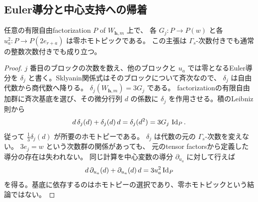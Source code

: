 \subsection{Euler導分と中心支持への帰着}

\begin{lemma}[ブロックpotentialの零ホモトピー]\label{lem:block-euler}
 任意の有限自由factorization \(P\) of \(W_{\mathbf h,m}\) 上で、
 各 \(G_j:P\to P(w)\) と各 \(u_a^2:P\to P(2e_{r+a})\) は零ホモトピックである。
 この主張は \(\Gamma_s\)-次数付きでも通常の整数次数付きでも成り立つ。
\end{lemma}
\begin{proof}
 \(j\) 番目のブロックの次数を数え、他のブロックと \(u_a\) では零となるEuler導分を
 \(\delta_j\) と書く。Sklyanin関係式はそのブロックについて斉次なので、
 \(\delta_j\) は自由代数から商代数へ降りる。
 \(\delta_j(W_{\mathbf h,m})=3G_j\) である。
 factorizationの有限自由加群に斉次基底を選び、その微分行列 \(d\) の係数に
 \(\delta_j\) を作用させる。積のLeibniz則から
 \[
 d\,\delta_j(d)+\delta_j(d)\,d
 =\delta_j(d^2)
 =3G_j\,\operatorname{Id}_P.
 \]
 従って \(\frac13\delta_j(d)\) が所要のホモトピーである。
 \(\delta_j\) は代数の元の \(\Gamma_s\)-次数を変えない。
 \(3e_j=w\) という次数群の関係があっても、
 元のtensor factorsから定義した導分の存在は失われない。
 同じ計算を中心変数の導分 \(\partial_{u_a}\) に対して行えば
 \[
 d\,\partial_{u_a}(d)+\partial_{u_a}(d)\,d=3u_a^2\operatorname{Id}_P
 \]
 を得る。基底に依存するのはホモトピーの選択であり、零ホモトピックという結論ではない。
\end{proof}

